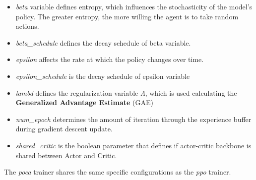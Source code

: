 \begin{itemize}
	\item \textit{beta} variable defines entropy, which influences the stochasticity of the model's policy. The greater entropy, the more willing the agent is to take random actions.
	\item \textit{beta\_schedule} defines the decay schedule of beta variable.
	\item \textit{epsilon} affects the rate at which the policy changes over time.
	\item \textit{epsilon\_schedule} is the decay schedule of epsilon variable
	\item \textit{lambd} defines the regularization variable $\Lambda$, which is used calculating the \textbf{Generalized Advantage Estimate} (GAE)
	\item \textit{num\_epoch} determines the amount of iteration through the experience buffer during gradient descent update.
	\item \textit{shared\_critic} is the boolean parameter that defines if actor-critic backbone is shared between Actor and Critic.
\end{itemize}
The \textit{poca} trainer shares the same specific configurations as the \textit{ppo} trainer.


